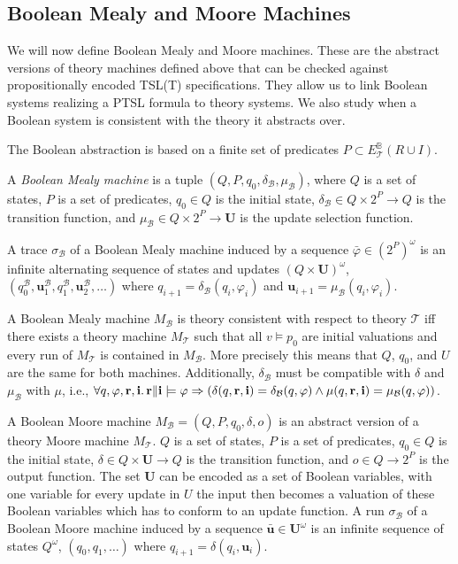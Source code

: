 \documentclass[runningheads]{llncs}
\newcommand{\theory}{\mathcal{T}}
\newcommand{\bool}{\mathcal{B}}
\newcommand{\updf}{\mathbf{u}}
\newcommand{\updfs}{\mathbf{U}}
\newcommand{\rvar}{\mathbf{r}}
\newcommand{\ivar}{\mathbf{i}}
\newcommand{\bexpr}{E_\theory^\mathbb{B}(R \cup I)}
\begin{document}
\subsection{Boolean Mealy and Moore Machines}

We will now define Boolean  Mealy and Moore machines.
These are the abstract versions of theory machines defined above that can be checked against  propositionally encoded TSL(T) specifications.
They allow us to link Boolean systems realizing a PTSL formula to theory systems.
We also study when a Boolean system is consistent with the theory it abstracts over.

The Boolean abstraction is based on a finite set of predicates $P \subset \bexpr$.

A \emph{Boolean Mealy machine} is a tuple $(Q, P, q_0, \delta_\bool, \mu_\bool)$, where
$Q$ is a set of states, $P$ is a set of predicates, $q_0 \in Q$ is the initial state, $\delta_\bool \in Q \times 2^P \to Q$ is the transition function, and $\mu_\bool \in Q \times 2^P \to \updfs$ is the update selection function.

A trace $\sigma_\bool$ of a Boolean Mealy machine induced by a sequence $\bar{\varphi} \in (2^P)^\omega$ is an infinite alternating sequence of states and updates ${(Q\times \updfs)}^\omega$, $(q_0^\bool, \updf_1^\bool, q_1^\bool, \updf_2^\bool, \ldots)$ where $q_{i+1} = \delta_\bool(q_i, \varphi_i)$ and $\updf_{i+1} = \mu_\bool(q_i,\varphi_i)$.

A Boolean Mealy machine $M_\bool$ is theory consistent with respect to theory $\theory$ iff there exists a theory machine $M_\theory$ such that all $v \models p_0$ are initial valuations and every run of $M_\theory$ is contained in $M_\bool$. More precisely this means that $Q$, $q_0$, and $U$ are the same for both machines. Additionally, $\delta_\bool$ must be compatible with $\delta$ and $\mu_\bool$ with $\mu$, i.e., $\forall q, \varphi, \rvar, \ivar \ldotp \rvar\|\ivar \models \varphi \Rightarrow (\delta(q,\rvar,\ivar)= \delta_\bool(q,\varphi) \land \mu(q,\rvar,\ivar)= \mu_\bool(q,\varphi))$.


A Boolean Moore machine $M_{\bool} = (Q, P, q_0, \delta, o)$ is an abstract version of a theory Moore machine $M_{\theory}$.
$Q$ is a set of states, $P$ is a set of predicates, $q_0 \in Q$ is the initial state,  $\delta \in Q \times \updfs \to Q$ is the transition function, and $o \in Q \to 2^P$ is the output function.
The set $\updfs$ can be encoded as a set of Boolean variables, with one variable for every update in $U$ the input then becomes a valuation of these Boolean variables which has to conform to an update function.
A run $\sigma_\bool$ of a Boolean Moore machine induced by a sequence $\bar{\updf} \in \updfs^\omega$ is an infinite sequence of states ${Q}^\omega$, $(q_0, q_1, \ldots)$ where $q_{i+1} = \delta(q_i, \updf_i)$.
\end{document}
